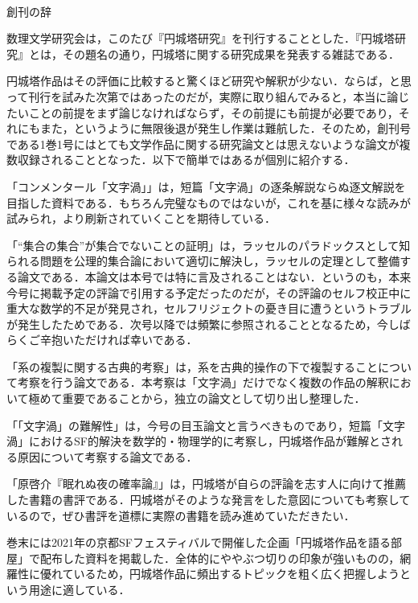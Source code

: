 \documentclass[10pt, a5paper, twoside]{jsarticle}
\theoremstyle{definition}
\begin{document}
	{\Large 　} %

	\begin{center}

		\Large{創刊の辞}

	\end{center}

	数理文学研究会は，このたび『円城塔研究』を刊行することとした．『円城塔研究』とは，その題名の通り，円城塔に関する研究成果を発表する雑誌である．

	円城塔作品はその評価に比較すると驚くほど研究や解釈が少ない．ならば，と思って刊行を試みた次第ではあったのだが，実際に取り組んでみると，本当に論じたいことの前提をまず論じなければならず，その前提にも前提が必要であり，それにもまた，というように無限後退が発生し作業は難航した．そのため，創刊号である1巻1号にはとても文学作品に関する研究論文とは思えないような論文が複数収録されることとなった．以下で簡単ではあるが個別に紹介する．

	「コンメンタール「文字渦」」は，短篇「文字渦」の逐条解説ならぬ逐文解説を目指した資料である．もちろん完璧なものではないが，これを基に様々な読みが試みられ，より刷新されていくことを期待している．

	「“集合の集合”が集合でないことの証明」は，ラッセルのパラドックスとして知られる問題を公理的集合論において適切に解決し，ラッセルの定理として整備する論文である．本論文は本号では特に言及されることはない．というのも，本来今号に掲載予定の評論で引用する予定だったのだが，その評論のセルフ校正中に重大な数学的不足が発見され，セルフリジェクトの憂き目に遭うというトラブルが発生したためである．次号以降では頻繁に参照されることとなるため，今しばらくご辛抱いただければ幸いである．

	「系の複製に関する古典的考察」は，系を古典的操作の下で複製することについて考察を行う論文である．本考察は「文字渦」だけでなく複数の作品の解釈において極めて重要であることから，独立の論文として切り出し整理した．

	「「文字渦」の難解性」は，今号の目玉論文と言うべきものであり，短篇「文字渦」におけるSF的解決を数学的・物理学的に考察し，円城塔作品が難解とされる原因について考察する論文である．

	「原啓介『眠れぬ夜の確率論』」は，円城塔が自らの評論を志す人に向けて推薦した書籍の書評である．円城塔がそのような発言をした意図についても考察しているので，ぜひ書評を道標に実際の書籍を読み進めていただきたい．

	巻末には2021年の京都SFフェスティバルで開催した企画「円城塔作品を語る部屋」で配布した資料を掲載した．全体的にややぶつ切りの印象が強いものの，網羅性に優れているため，円城塔作品に頻出するトピックを粗く広く把握しようという用途に適している．
\end{document}

